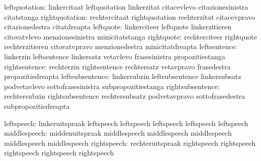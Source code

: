             leftquotation: linkercitaat              leftquotation
                           linkerzitat               citacevlevo
                           citazionesinistra         citatstanga
           rightquotation: rechtercitaat             rightquotation
                           rechterzitat              citacevpravo
                           citazionedestra           citatdreapta
                leftquote: linkerciteer              leftquote
                           linkerzitieren            citovatvlevo
                           menzionesinistra          minicitatstanga
               rightquote: rechterciteer             rightquote
                           rechterzitieren           citovatvpravo
                           menzionedestra            minicitatdreapta
             leftsentence: linkerzin                 leftsentence
                           linkersatz                vetavlevo
                           frasesinistra             propozitiestanga
            rightsentence: rechterzin                rightsentence
                           rechtersatz               vetavpravo
                           frasedestra               propozitiedreapta
          leftsubsentence: linkersubzin              leftsubsentence
                           linkersubsatz             podvetavlevo
                           sottofrasesinistra        subpropozitiestanga
         rightsubsentence: rechtersubzin             rightsubsentence
                           rechtersubsatz            podvetavpravo
                           sottofrasedestra          subpropozitiedreapta

               leftspeech: linkeruitspraak           leftspeech
                           leftspeech                leftspeech
                           leftspeech                leftspeech %
             middlespeech: middenuitspraak           middlespeech
                           middlespeech              middlespeech
                           middlespeech              middlespeech %
              rightspeech: rechteruitspraak          rightspeech
                           rightspeech               rightspeech
                           rightspeech               rightspeech %

